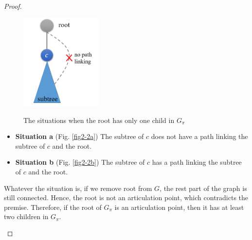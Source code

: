 \documentclass[12pt,a4paper]{article}
\theoremstyle{definition}
\begin{document}
\begin{enumerate}
\begin{proof}
\begin{enumerate}
\begin{itemize}
\begin{figure}[h]
{\begin{minipage}[t]{0.4\linewidth}
                        \centering
                        \includegraphics[width=1.6in]{figures/prob2-1-2a.png}
                    \end{minipage}
                    \label{fig2-2a}
                }
              \caption{The situations when the root has only one child in $G_{\pi}$}\label{fig2-2}
            \end{figure}
            \begin{itemize}
            \item \textbf{Situation a} (Fig. \ref{fig2-2a}) The subtree of $c$ does not have a path linking the subtree of $c$ and the root.
            \item \textbf{Situation b} (Fig. \ref{fig2-2b}) The subtree of $c$ has a path linking the subtree of $c$ and the root.
            \end{itemize}
            Whatever the situation is, if we remove root from $G$, the rest part of the graph is still connected. Hence, the root is not an articulation point, which contradicts the premise. Therefore, if the root of $G_{\pi}$ is an articulation point, then it has at least two children in $G_{\pi}$.

\end{itemize}
\end{enumerate}
\end{proof}
\end{enumerate}
\end{document}
